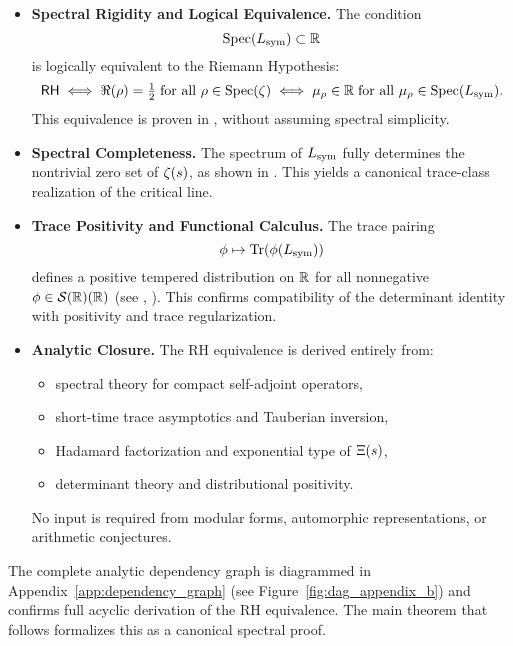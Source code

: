 \begin{itemize}
  \item \textbf{Spectral Rigidity and Logical Equivalence.}  
  The condition
  \[
  \operatorname{Spec}(L_{\mathrm{sym}}) \subset \mathbb{R}
  \]
  is logically equivalent to the Riemann Hypothesis:
  \[
  \mathsf{RH} \iff \Re(\rho) = \tfrac{1}{2} \;\text{for all } \rho \in \operatorname{Spec}(\zeta)
       \iff \mu_\rho \in \mathbb{R} \;\text{for all } \mu_\rho \in \operatorname{Spec}(L_{\mathrm{sym}}).
  \]
  This equivalence is proven in , without assuming spectral simplicity.

  \item \textbf{Spectral Completeness.}  
  The spectrum of \( L_{\mathrm{sym}} \) fully determines the nontrivial zero set of \( \zeta(s) \), as shown in . This yields a canonical trace-class realization of the critical line.

  \item \textbf{Trace Positivity and Functional Calculus.}  
  The trace pairing
  \[
  \phi \mapsto \operatorname{Tr}(\phi(L_{\mathrm{sym}}))
  \]
  defines a positive tempered distribution on \( \mathbb{R} \) for all nonnegative \( \phi \in \mathcal{S}(\mathbb{R})(\mathbb{R}) \) (see , ). This confirms compatibility of the determinant identity with positivity and trace regularization.

  \item \textbf{Analytic Closure.}  
  The RH equivalence is derived entirely from:
  \begin{itemize}
    \item spectral theory for compact self-adjoint operators,
    \item short-time trace asymptotics and Tauberian inversion,
    \item Hadamard factorization and exponential type of \( \Xi(s) \),
    \item determinant theory and distributional positivity.
  \end{itemize}
  No input is required from modular forms, automorphic representations, or arithmetic conjectures.
\end{itemize}

\medskip
\noindent
The complete analytic dependency graph is diagrammed in Appendix~\ref{app:dependency_graph} (see Figure~\ref{fig:dag_appendix_b}) and confirms full acyclic derivation of the RH equivalence. The main theorem that follows formalizes this as a canonical spectral proof.
